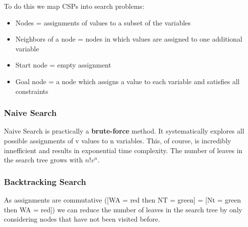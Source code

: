 \documentclass[
../../EiKI_Summary.tex,
]
{subfiles}
\begin{document}
To do this we map CSPs into search problems:
\begin{itemize}
    \item Nodes = assignments of values to a subset of the variables
    \item Neighbors of a node = nodes in which values are assigned to one additional variable
    \item Start node = empty assignment
    \item Goal node = a node which assigns a value to each variable and satisfies all constraints
\end{itemize}

\subsubsection{Naive Search}
Naive Search is practically a \textbf{brute-force} method. It systematically explores all possible assignments of v values to n variables. This, of course, is incredibly innefficient and results in exponential time complexity. The number of leaves in the search tree grows with $n!v^n$.

\subsubsection{Backtracking Search}
As assignments are commutative ([WA = red then NT = green] = [Nt = green then WA = red]) we can reduce the number of leaves in the search tree by only considering nodes that have not been visited before.

\begin{codebox}
    \begin{algorithm}[H]

    \end{algorithm}
\end{codebox}
\end{document}
